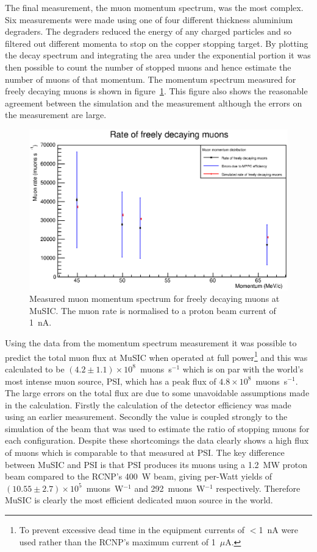 The final measurement, the muon momentum spectrum, was the most complex. Six measurements were made using one of four different thickness aluminium degraders. The degraders reduced the energy of any charged particles and so filtered out different momenta to stop on the copper stopping target. By plotting the decay spectrum and integrating the area under the exponential portion it was then possible to count the number of stopped muons and hence estimate the number of muons of that momentum. The momentum spectrum measured for freely decaying muons is shown in figure~\ref{fig:exec_summary_muon_momentum_spectrum}. This figure also shows the reasonable agreement between the simulation and the measurement although the errors on the measurement are large. 

\begin{figure}[htpb]
  \centering
    \includegraphics[width=.9\textwidth]{../3_measurements/images/plot_generating_scripts/adjusted_muon_rates_exec_summary_version.eps}
  \caption{Measured muon momentum spectrum for freely decaying muons at MuSIC. The muon rate is normalised to a proton beam current of 1~nA.}
  \label{fig:exec_summary_muon_momentum_spectrum}
\end{figure}

Using the data from the momentum spectrum measurement it was possible to predict the total muon flux at MuSIC when operated at full power\footnote{To prevent excessive dead time in the equipment currents of \(<\)1~nA were used rather than the RCNP's maximum current of 1~\(\mu\)A.} and this was calculated to be \((4.2\pm1.1)\times10^8\)~muons~s\(^{-1}\) which is on par with the world's most intense muon source, PSI, which has a peak flux of \(4.8\times10^8\)~muons~s\(^{-1}\). The large errors on the total flux are due to some unavoidable assumptions made in the calculation. Firstly the calculation of the detector efficiency was made using an earlier measurement. Secondly the value is coupled strongly to the simulation of the beam that was used to estimate the ratio of stopping muons for each configuration. Despite these shortcomings the data clearly shows a high flux of muons which is comparable to that measured at PSI. The key difference between MuSIC and PSI is that PSI produces its muons using a 1.2~MW proton beam compared to the RCNP's 400~W beam, giving per-Watt yields of \((10.55\pm2.7)\times10^5\)~muons~W\(^{-1}\) and 292~muons~W\(^{-1}\) respectively. Therefore MuSIC is clearly the most efficient dedicated muon source in the world.

